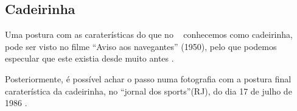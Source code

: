 \subsection{Cadeirinha}


Uma postura com as caraterísticas do que no \AnoLivro~ conhecemos como cadeirinha, 
pode ser visto no filme ``Aviso aos navegantes'' (1950),
pelo que podemos especular que este existia desde muito antes \cite[min. 40:35]{AtlantidaDance}.

Posteriormente, é possível achar o passo numa fotografia com a postura final caraterística da cadeirinha, 
no ``jornal dos sports''(RJ),
do dia 17 de julho de 1986 \cite[pp. 6]{gafieiraaredeout2}. 
